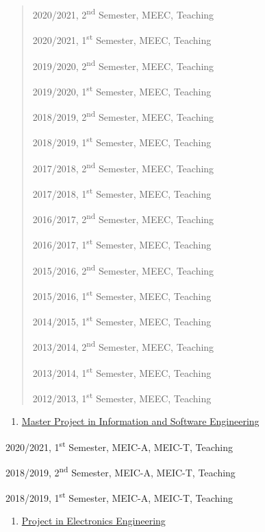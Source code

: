 \documentclass[
]{article}
\begin{document}
\begin{quote}
2020/2021, 2\textsuperscript{nd} Semester, MEEC, Teaching

2020/2021, 1\textsuperscript{st} Semester, MEEC, Teaching

2019/2020, 2\textsuperscript{nd} Semester, MEEC, Teaching

2019/2020, 1\textsuperscript{st} Semester, MEEC, Teaching

2018/2019, 2\textsuperscript{nd} Semester, MEEC, Teaching

2018/2019, 1\textsuperscript{st} Semester, MEEC, Teaching

2017/2018, 2\textsuperscript{nd} Semester, MEEC, Teaching

2017/2018, 1\textsuperscript{st} Semester, MEEC, Teaching

2016/2017, 2\textsuperscript{nd} Semester, MEEC, Teaching

2016/2017, 1\textsuperscript{st} Semester, MEEC, Teaching

2015/2016, 2\textsuperscript{nd} Semester, MEEC, Teaching

2015/2016, 1\textsuperscript{st} Semester, MEEC, Teaching

2014/2015, 1\textsuperscript{st} Semester, MEEC, Teaching

2013/2014, 2\textsuperscript{nd} Semester, MEEC, Teaching

2013/2014, 1\textsuperscript{st} Semester, MEEC, Teaching

2012/2013, 1\textsuperscript{st} Semester, MEEC, Teaching
\end{quote}

\begin{enumerate}
\def\labelenumi{\arabic{enumi}.}
\setcounter{enumi}{25}
\item
  \ul{Master Project in Information and Software Engineering}
\end{enumerate}

2020/2021, 1\textsuperscript{st} Semester, MEIC-A, MEIC-T, Teaching

2018/2019, 2\textsuperscript{nd} Semester, MEIC-A, MEIC-T, Teaching

2018/2019, 1\textsuperscript{st} Semester, MEIC-A, MEIC-T, Teaching

\begin{enumerate}
\def\labelenumi{\arabic{enumi}.}
\setcounter{enumi}{26}
\item
  \ul{Project in Electronics Engineering}
\end{enumerate}
\end{document}
